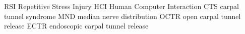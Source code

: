 	{RSI}	{Repetitive Stress Injury}
	{HCI}	{Human Computer Interaction}
   {CTS}   {carpal tunnel syndrome}
   {MND}   {median nerve distribution}
  {OCTR}  {open carpal tunnel release}
  {ECTR}  {endoscopic carpal tunnel release}